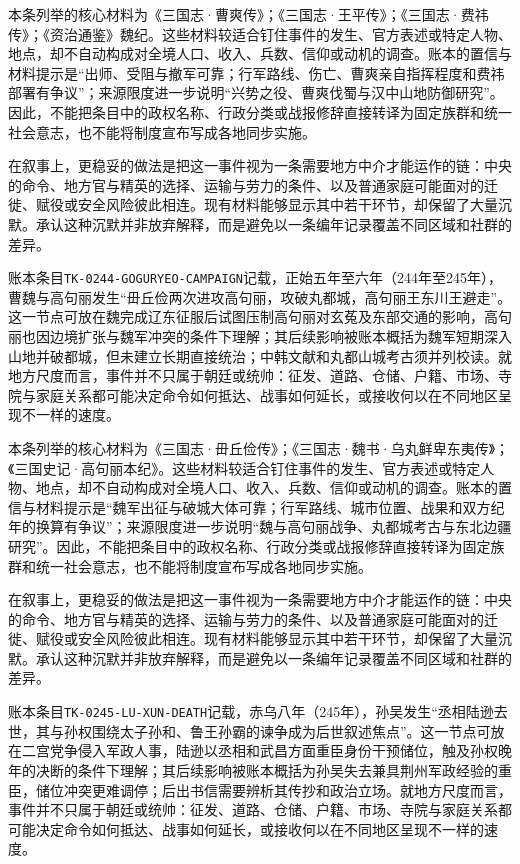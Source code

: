 本条列举的核心材料为《三国志·曹爽传》；《三国志·王平传》；《三国志·费祎传》；《资治通鉴》魏纪。这些材料较适合钉住事件的发生、官方表述或特定人物、地点，却不自动构成对全境人口、收入、兵数、信仰或动机的调查。账本的置信与材料提示是“出师、受阻与撤军可靠；行军路线、伤亡、曹爽亲自指挥程度和费祎部署有争议”；来源限度进一步说明“兴势之役、曹爽伐蜀与汉中山地防御研究”。因此，不能把条目中的政权名称、行政分类或战报修辞直接转译为固定族群和统一社会意志，也不能将制度宣布写成各地同步实施。

在叙事上，更稳妥的做法是把这一事件视为一条需要地方中介才能运作的链：中央的命令、地方官与精英的选择、运输与劳力的条件、以及普通家庭可能面对的迁徙、赋役或安全风险彼此相连。现有材料能够显示其中若干环节，却保留了大量沉默。承认这种沉默并非放弃解释，而是避免以一条编年记录覆盖不同区域和社群的差异。

账本条目\texttt{TK-0244-GOGURYEO-CAMPAIGN}记载，正始五年至六年（244年至245年），曹魏与高句丽发生“毌丘俭两次进攻高句丽，攻破丸都城，高句丽王东川王避走”。这一节点可放在魏完成辽东征服后试图压制高句丽对玄菟及东部交通的影响，高句丽也因边境扩张与魏军冲突的条件下理解；其后续影响被账本概括为魏军短期深入山地并破都城，但未建立长期直接统治；中韩文献和丸都山城考古须并列校读。就地方尺度而言，事件并不只属于朝廷或统帅：征发、道路、仓储、户籍、市场、寺院与家庭关系都可能决定命令如何抵达、战事如何延长，或接收何以在不同地区呈现不一样的速度。

本条列举的核心材料为《三国志·毌丘俭传》；《三国志·魏书·乌丸鲜卑东夷传》；《三国史记·高句丽本纪》。这些材料较适合钉住事件的发生、官方表述或特定人物、地点，却不自动构成对全境人口、收入、兵数、信仰或动机的调查。账本的置信与材料提示是“魏军出征与破城大体可靠；行军路线、城市位置、战果和双方纪年的换算有争议”；来源限度进一步说明“魏与高句丽战争、丸都城考古与东北边疆研究”。因此，不能把条目中的政权名称、行政分类或战报修辞直接转译为固定族群和统一社会意志，也不能将制度宣布写成各地同步实施。

在叙事上，更稳妥的做法是把这一事件视为一条需要地方中介才能运作的链：中央的命令、地方官与精英的选择、运输与劳力的条件、以及普通家庭可能面对的迁徙、赋役或安全风险彼此相连。现有材料能够显示其中若干环节，却保留了大量沉默。承认这种沉默并非放弃解释，而是避免以一条编年记录覆盖不同区域和社群的差异。

账本条目\texttt{TK-0245-LU-XUN-DEATH}记载，赤乌八年（245年），孙吴发生“丞相陆逊去世，其与孙权围绕太子孙和、鲁王孙霸的谏争成为后世叙述焦点”。这一节点可放在二宫党争侵入军政人事，陆逊以丞相和武昌方面重臣身份干预储位，触及孙权晚年的决断的条件下理解；其后续影响被账本概括为孙吴失去兼具荆州军政经验的重臣，储位冲突更难调停；后出书信需要辨析其传抄和政治立场。就地方尺度而言，事件并不只属于朝廷或统帅：征发、道路、仓储、户籍、市场、寺院与家庭关系都可能决定命令如何抵达、战事如何延长，或接收何以在不同地区呈现不一样的速度。

